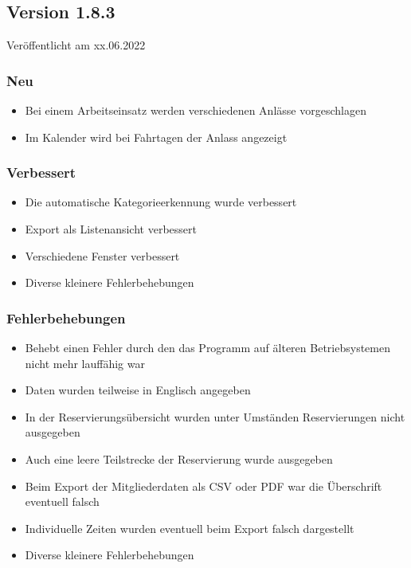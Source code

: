 \begin{neu}
\subsection{Version 1.8.3}
\label{version:1:8:3}
Veröffentlicht am xx.06.2022
\subsubsection{Neu}
\begin{itemize}
  \item
  Bei einem Arbeitseinsatz werden verschiedenen Anlässe vorgeschlagen
  \item
  Im Kalender wird bei Fahrtagen der Anlass angezeigt
\end{itemize}
\subsubsection{Verbessert}
\begin{itemize}
  \item
  Die automatische Kategorieerkennung wurde verbessert
  \item
  Export als Listenansicht verbessert
  \item
  Verschiedene Fenster verbessert
  \item
  Diverse kleinere Fehlerbehebungen
\end{itemize}

\subsubsection{Fehlerbehebungen}
\begin{itemize}
  \item
  Behebt einen Fehler durch den das Programm auf älteren Betriebsystemen nicht mehr lauffähig war
  \item
  Daten wurden teilweise in Englisch angegeben
  \item
  In der Reservierungsübersicht wurden unter Umständen Reservierungen nicht ausgegeben
  \item
  Auch eine leere Teilstrecke der Reservierung wurde ausgegeben
  \item
  Beim Export der Mitgliederdaten als CSV oder PDF war die Überschrift eventuell falsch
  \item
  Individuelle Zeiten wurden eventuell beim Export falsch dargestellt
  \item
  Diverse kleinere Fehlerbehebungen
\end{itemize}
\end{neu}
